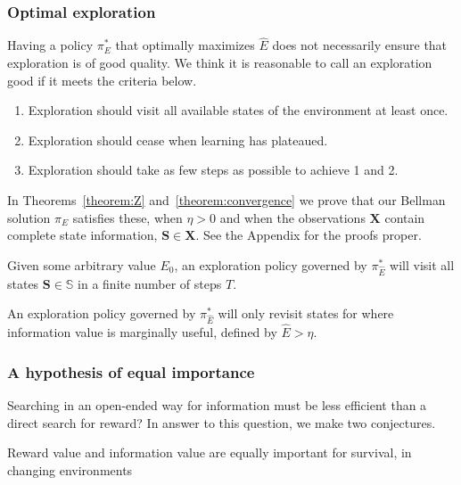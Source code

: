 \subsubsection*{Optimal exploration}
Having a policy $\pi_E^*$ that optimally maximizes $\hat E$ does not necessarily ensure that exploration is of good quality. We think it is reasonable to call an exploration good if it meets the criteria below. 

\begin{enumerate}
	\item Exploration should visit all available states of the environment at least once.
	\item Exploration should cease when learning has plateaued.
	\item Exploration should take as few steps as possible to achieve 1 and 2.
\end{enumerate}

In Theorems~\ref{theorem:Z} and~\ref{theorem:convergence} we prove that our Bellman solution $\pi_E$ satisfies these, when $\eta > 0$ and when the observations $\mathbf{X}$ contain complete state information, $\mathbf{S} \in \mathbf{X}$. See the Appendix for the proofs proper.

\begin{theorem} 
	\label{theorem:Z} 
	Given some arbitrary value $E_0$, an exploration policy governed by $\pi^*_{\hat E}$ will visit all states $\mathbf{S} \in \mathbb{S}$ in a finite number of steps $T$.
\end{theorem}

\begin{theorem} 
	\label{theorem:convergence} 
	An exploration policy governed by $\pi^*_{\hat E}$ will only revisit states for where information value is marginally useful, defined by $\hat E > \eta$.  
\end{theorem}


\subsubsection*{A hypothesis of equal importance}
 Searching in an open-ended way for information must be less efficient than a direct search for reward? In answer to this question, we make two conjectures.

\begin{conjecture}
	Reward value and information value are equally important for survival, in changing environments 
\end{conjecture}

